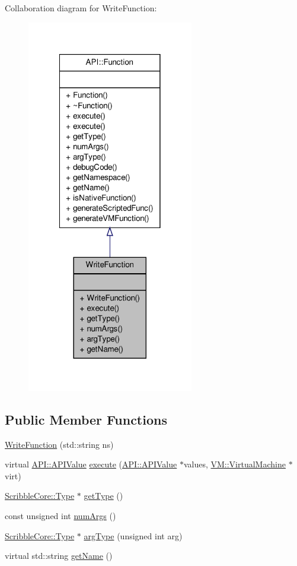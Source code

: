 Collaboration diagram for Write\-Function\-:
\nopagebreak
\begin{figure}[H]
\begin{center}
\leavevmode
\includegraphics[width=206pt]{class_write_function__coll__graph}
\end{center}
\end{figure}
\subsection*{Public Member Functions}
\begin{DoxyCompactItemize}
\item 
\hyperlink{class_write_function_ad6e416a0d8e38b55a02ac2ace7941dfb}{Write\-Function} (std\-::string ns)
\item 
virtual \hyperlink{class_a_p_i_1_1_a_p_i_value}{A\-P\-I\-::\-A\-P\-I\-Value} \hyperlink{class_write_function_a595652aa0e6f2f2dab95b251f4fed934}{execute} (\hyperlink{class_a_p_i_1_1_a_p_i_value}{A\-P\-I\-::\-A\-P\-I\-Value} $\ast$values, \hyperlink{class_v_m_1_1_virtual_machine}{V\-M\-::\-Virtual\-Machine} $\ast$virt)
\item 
\hyperlink{class_scribble_core_1_1_type}{Scribble\-Core\-::\-Type} $\ast$ \hyperlink{class_write_function_af13b3f0f1a575a4836e7a0743dfc0016}{get\-Type} ()
\item 
const unsigned int \hyperlink{class_write_function_a19c26d1f8efd08ae7ef0051ca32fc1e9}{num\-Args} ()
\item 
\hyperlink{class_scribble_core_1_1_type}{Scribble\-Core\-::\-Type} $\ast$ \hyperlink{class_write_function_a223f1c9a6f2d88ca561409fa21af3d86}{arg\-Type} (unsigned int arg)
\item 
virtual std\-::string \hyperlink{class_write_function_ab3a0ff179dc7ca7e92577e1a0ba010bf}{get\-Name} ()
\end{DoxyCompactItemize}
